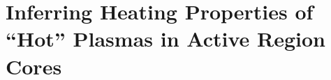 \chapter{Inferring Heating Properties of ``Hot'' Plasmas in Active Region Cores}\label{ch:inferring_hot_plasma}

